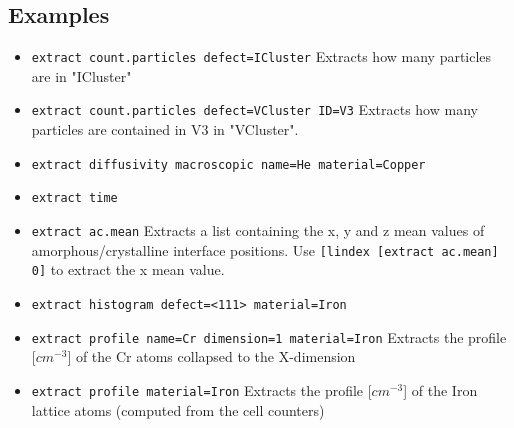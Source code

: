 \subsection{Examples}
\begin{itemize}
\item \verb+extract count.particles defect=ICluster+ Extracts how many particles are in "ICluster"
\item \verb+extract count.particles defect=VCluster ID=V3+ Extracts how many particles are contained in V3 in "VCluster".
\item \verb+extract diffusivity macroscopic name=He material=Copper+
\item \verb+extract time+
\item \verb+extract ac.mean+ Extracts a list containing the x, y and z mean values of amorphous/crystalline interface positions. Use \verb+[lindex [extract ac.mean] 0]+ to extract the x mean value.
\item \verb+extract histogram defect=<111> material=Iron+ 
\item \verb+extract profile name=Cr dimension=1 material=Iron+ Extracts the profile [$cm^{-3}$] of the Cr atoms collapsed to the X-dimension
\item \verb+extract profile material=Iron+ Extracts the profile [$cm^{-3}$] of the Iron lattice atoms (computed from the cell counters)
\end{itemize}
